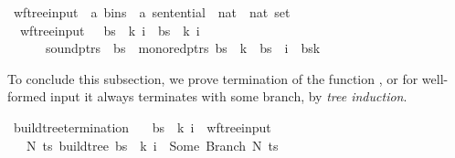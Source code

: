 \begin{isabellebody}
\isanewline
{}\isamarkupfalse%
\ wf{\isacharunderscore}{\kern0pt}tree{\isacharunderscore}{\kern0pt}input\ {\isacharcolon}{\kern0pt}{\isacharcolon}{\kern0pt}\ {\isachardoublequoteopen}{\isacharparenleft}{\kern0pt}{\isacharprime}{\kern0pt}a\ bins\ {\isasymtimes}\ {\isacharprime}{\kern0pt}a\ sentential\ {\isasymtimes}\ nat\ {\isasymtimes}\ nat{\isacharparenright}{\kern0pt}\ set{\isachardoublequoteclose}\ \isanewline
\ \ {\isachardoublequoteopen}wf{\isacharunderscore}{\kern0pt}tree{\isacharunderscore}{\kern0pt}input\ {\isacharequal}{\kern0pt}\ {\isacharbraceleft}{\kern0pt}\ {\isacharparenleft}{\kern0pt}bs{\isacharcomma}{\kern0pt}\ {\isasymomega}{\isacharcomma}{\kern0pt}\ k{\isacharcomma}{\kern0pt}\ i{\isacharparenright}{\kern0pt}\ {\isacharbar}{\kern0pt}\ bs\ {\isasymomega}\ k\ i{\isachardot}{\kern0pt}\isanewline
\ \ \ \ \ \ sound{\isacharunderscore}{\kern0pt}ptrs\ {\isasymomega}\ bs\ {\isasymand}\ mono{\isacharunderscore}{\kern0pt}red{\isacharunderscore}{\kern0pt}ptrs\ bs\ {\isasymand}\ k\ {\isacharless}{\kern0pt}\ {\isacharbar}{\kern0pt}bs{\isacharbar}{\kern0pt}\ {\isasymand}\ i\ {\isacharless}{\kern0pt}\ {\isacharbar}{\kern0pt}bs{\isacharbang}{\kern0pt}k{\isacharbar}{\kern0pt}\ {\isacharbraceright}{\kern0pt}{\isachardoublequoteclose}%
\begin{isamarkuptext}%
To conclude this subsection, we prove termination of the function , or for
well-formed input it always terminates with some branch, by \textit{tree induction}.%
\end{isamarkuptext}\isamarkuptrue%
\isamarkupfalse%
\ build{\isacharunderscore}{\kern0pt}tree{\isacharprime}{\kern0pt}{\isacharunderscore}{\kern0pt}termination{\isacharcolon}{\kern0pt}\isanewline
\ \ \ {\isachardoublequoteopen}{\isacharparenleft}{\kern0pt}bs{\isacharcomma}{\kern0pt}\ {\isasymomega}{\isacharcomma}{\kern0pt}\ k{\isacharcomma}{\kern0pt}\ i{\isacharparenright}{\kern0pt}\ {\isasymin}\ wf{\isacharunderscore}{\kern0pt}tree{\isacharunderscore}{\kern0pt}input{\isachardoublequoteclose}\isanewline
\ \ \ {\isachardoublequoteopen}{\isasymexists}N\ ts{\isachardot}{\kern0pt}\ build{\isacharunderscore}{\kern0pt}tree{\isacharprime}{\kern0pt}\ bs\ {\isasymomega}\ k\ i\ {\isacharequal}{\kern0pt}\ Some\ {\isacharparenleft}{\kern0pt}Branch\ N\ ts{\isacharparenright}{\kern0pt}{\isachardoublequoteclose}%
\isadelimproof
%
\endisadelimproof
%
\isatagproof
%
\endisatagproof
{\isafoldproof}%
%
\isadelimproof
%
\endisadelimproof

\end{isabellebody}
